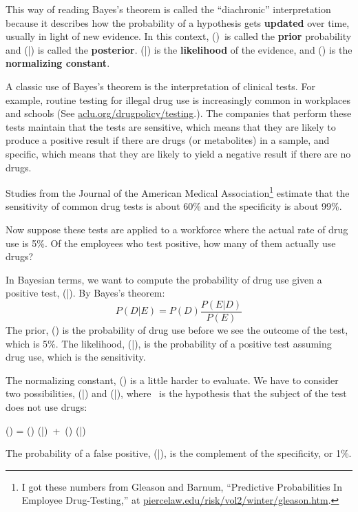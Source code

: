 \documentclass[12pt]{book}
\begin{document}
This way of reading Bayes's theorem is called the ``diachronic''
interpretation because it describes how the probability of a
hypothesis gets {\bf updated} over time, usually in light of new
evidence.  In this context, \Prob(\HH)\ is called the {\bf prior}
probability and \Prob(\HH|\E) is called the {\bf posterior}.
\Prob(\E|\HH) is the {\bf likelihood} of the evidence, and
\Prob(\E) is the {\bf normalizing constant}.

A classic use of Bayes's theorem is the interpretation of clinical
tests.  For example, routine testing for illegal drug use is
increasingly common in workplaces and schools (See
\url{aclu.org/drugpolicy/testing}.).  The companies that
perform these tests maintain that the tests are sensitive, which means
that they are likely to produce a positive result if there are drugs
(or metabolites) in a sample, and specific, which means that they are
likely to yield a negative result if there are no drugs.

Studies from the Journal of the American Medical
Association\footnote{I got these numbers from Gleason and Barnum,
  ``Predictive Probabilities In Employee Drug-Testing,'' at
  \url{piercelaw.edu/risk/vol2/winter/gleason.htm}.} estimate that
the sensitivity of common drug tests is about 60\% and the specificity
is about 99\%.

Now suppose these tests are applied to a workforce where the
actual rate of drug use is 5\%.  Of the employees who test positive,
how many of them actually use drugs?

In Bayesian terms, we want to compute the probability of
drug use given a positive test, \Prob(\D|\E).  By Bayes's theorem:
%
\[ P(D|E) = P(D) \frac{P(E|D)}{P(E)} \]
%
The prior, \Prob(\D) is the probability of drug use before we
see the outcome of the test, which is 5\%.
The likelihood, \Prob(\E|\D), is the probability
of a positive test assuming drug use, which is the sensitivity.

The normalizing constant, \Prob(\E) is a little harder to evaluate.  We
have to consider two possibilities, \Prob(\E|\D) and \Prob(\E|\N), where
\N~is the hypothesis that the subject of the test does not use drugs:

\quad \Prob(\E) = \Prob(\D) \Prob(\E|\D)~+~\Prob(\N) \Prob(\E|\N)

The probability of a false positive, \Prob(\E|\N), is the complement
of the specificity, or 1\%.
\end{document}
